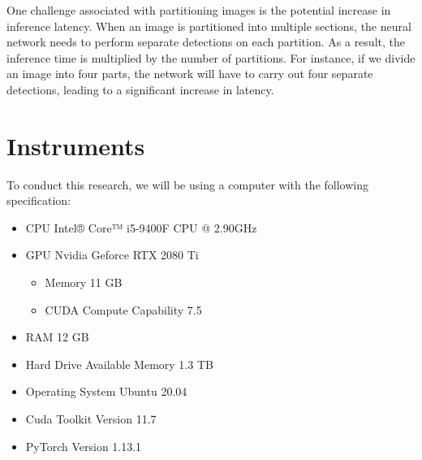   One challenge associated with partitioning images is the potential increase in inference latency.
  When an image is partitioned into multiple sections, the neural network needs to perform separate detections on each partition.
  As a result, the inference time is multiplied by the number of partitions.
  For instance, if we divide an image into four parts, the network will have to carry out four separate detections, leading to a significant increase in latency. 
    
\section{Instruments}
\label{section:instrument}
To conduct this research, we will be using a computer with the following specification:
\begin{itemize}[noitemsep,topsep=0pt,leftmargin=.1\textwidth,rightmargin=.1\textwidth]
  \item CPU \hfill Intel® Core™ i5-9400F CPU @ 2.90GHz
  \item GPU \hfill Nvidia Geforce RTX 2080 Ti
  \begin{itemize}[noitemsep,topsep=0pt]
    \item[] Memory \hfill 11 GB
    \item[] CUDA Compute Capability \hfill 7.5
  \end{itemize}
  \item RAM \hfill 12 GB
  \item Hard Drive Available Memory \hfill 1.3 TB
  \item Operating System \hfill Ubuntu 20.04
  \item Cuda Toolkit Version \hfill 11.7
  \item PyTorch Version \hfill 1.13.1
\end{itemize}

